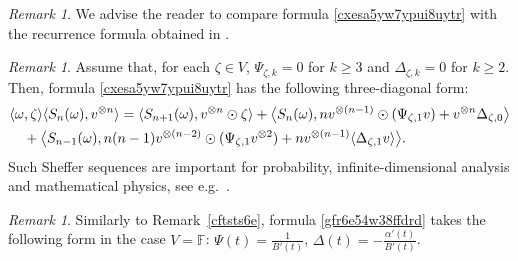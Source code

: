 \documentclass[12pt]{article}
\theoremstyle{remark}
\theoremstyle{remark}
\theoremstyle{remark}
\newtheorem{remark}[theorem]{Remark}
\begin{document}
 
 \begin{remark}\label{cftdsy6rue6i}
  We advise the reader to compare formula \eqref{cxesa5yw7ypui8uytr} with the recurrence formula obtained in  \cite[Theorem~2.3.4]{Watanabe2}.
  \end{remark}
  
  \begin{remark}Assume that, for each $\zeta \in V$, $\Psi_{\zeta,k}=0$ for $k\ge3$ and $\Delta_{\zeta,k}=0$ for $k\ge2$. Then, formula \eqref{cxesa5yw7ypui8uytr} has the following three-diagonal form:
  \begin{align}
  &\langle\omega,\zeta\rangle\langle S_n(\omega),v^{\otimes n}\rangle=\langle S_{n+1}(\omega),v^{\otimes n}\odot\zeta\rangle%
  +\big\langle S_n(\omega), nv^{\otimes(n-1)}\odot(\Psi_{\zeta,1}v)+v^{\otimes n}\Delta_{\zeta,0}\big\rangle\notag\\
  &\quad+\big\langle S_{n-1}(\omega), n(n-1)v^{\otimes(n-2)}\odot(\Psi_{\zeta,1}v^{\otimes 2})+nv^{\otimes (n-1)}\langle\Delta_{\zeta,1}v\rangle\big\rangle.\notag
    \end{align}
 Such Sheffer sequences are important for probability, infinite-dimensional analysis and mathematical physics,  see e.g.\ \cite{BK, Lytvynov2003,Jansen1,Hida,ItoKubo}. 
  \end{remark}
 
  
  \begin{remark}
  Similarly to Remark~\ref{cftsts6e}, formula \eqref{gfr6e54w38ffdrd} takes the following form  in the case $V=\mathbb F$:
  $\Psi(t)=\frac1{B'(t)}$, $\Delta(t)=-\frac{\alpha'(t)}{B'(t)}$.
  \end{remark}
  
\end{document}
